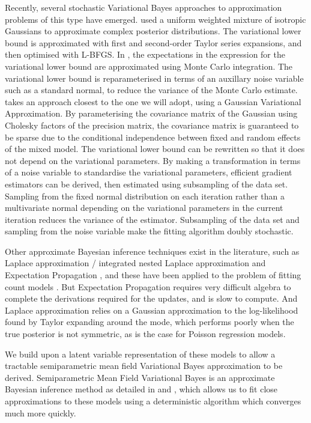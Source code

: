 Recently, several stochastic Variational Bayes approaches to approximation problems of this type have emerged.
\cite{Gershman2012} used a uniform weighted mixture of isotropic Gaussians to approximate complex posterior
distributions. The variational lower bound is approximated with first and second-order Taylor series
expansions, and then optimised with L-BFGS.
In \cite{Kingma2013}, the expectations in the expression for the variational lower bound are approximated
using Monte Carlo integration. The variational lower bound is reparameterised in terms of an auxillary
noise variable such as a standard normal, to reduce the variance of the Monte Carlo estimate.
\cite{Tan2018} takes an approach closest to the one we will adopt, using a Gaussian Variational Approximation.
By parameterising the covariance matrix of the Gaussian using Cholesky
factors of the precision matrix, the covariance matrix is guaranteed to be sparse due to the conditional
independence between fixed and random effects of the mixed model. The variational lower bound can be rewritten
so that it does not depend on the variational parameters. 
By making a transformation in terms of a noise variable to standardise the variational parameters,
efficient gradient estimators can be derived, then estimated using subsampling of the data set. Sampling
from the fixed normal distribution on each iteration rather than a multivariate normal depending on the
variational parameters in the current iteration reduces the variance of the estimator.
Subsampling of the data set and sampling from the noise variable make the fitting algorithm doubly stochastic.

Other approximate Bayesian inference techniques exist in the literature, such as
Laplace approximation \cite{Tierney1986}/ integrated nested Laplace approximation \cite{Rue2009} and Expectation Propagation \cite{Minka2013}, and these have been applied to the problem of fitting
count models
\cite{Barber2016}
\cite{KimWand2017}.
But Expectation Propagation requires very difficult algebra to complete the derivations required for the
updates, and is slow to compute. And Laplace approximation relies on a Gaussian approximation to the
log-likelihood found by Taylor expanding around the mode, which performs poorly when the true posterior is
not symmetric, as is the case for Poisson regression models.

We build upon a latent variable representation of these models to allow a tractable semiparametric mean field
Variational Bayes approximation to be derived. Semiparametric Mean Field Variational Bayes is an approximate
Bayesian inference method as detailed in \cite{Ormerod2010} and \cite{Rohde2015}, which allows us to fit
close approximations to these models using a deterministic  algorithm which converges much more quickly.


